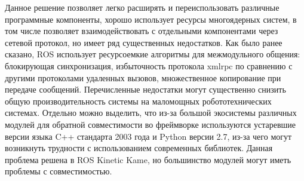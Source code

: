 Данное решение позволяет легко расширять и переиспользовать 
различные программные компоненты, хорошо использует ресурсы 
многоядерных систем, в том числе позволяет взаимодействовать с 
отдельными компонентами через сетевой протокол, но имеет ряд 
существенных недостатков. Как было ранее сказано, ROS 
использует ресурсоемкие алгоритмы для межмодульного общения: 
блокирующая синхронизация, избыточность протокола xmlrpc по 
сравнению с другими протоколами удаленных вызовов, множественное 
копирование при передаче сообщений. Перечисленные недостатки 
могут существенно снизить общую производительность системы на 
маломощных робототехнических системах. Отдельно можно выделить, 
что из-за большой экосистемы различных модулей для обратной 
совместимости во фреймворке используются устаревшие версии языка 
C++ стандарта 2003 года и Python версии 2.7, из-за чего могут 
возникнуть трудности с использованием современных библиотек. 
Данная проблема решена в ROS Kinetic Kame, но большинство 
модулей могут иметь проблемы с совместимостью.


